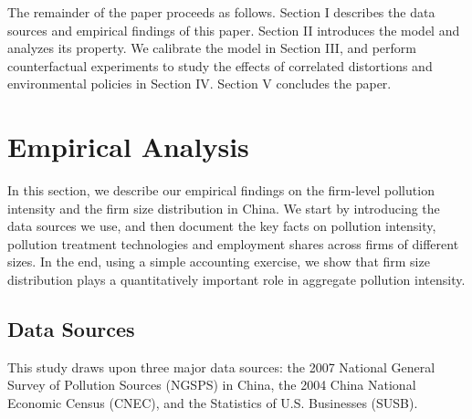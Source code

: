 \documentclass[AEJ]{AEA}
\begin{document}
The remainder of the paper proceeds as follows. Section I describes the data sources and empirical findings of this paper. Section II introduces the model and analyzes its property. We calibrate the model in Section III, and perform counterfactual experiments to study the effects of correlated distortions and environmental policies in Section IV. Section V concludes the paper.

\section{Empirical Analysis}

In this section, we describe our empirical findings on the firm-level pollution intensity and the firm size distribution in China. We start by introducing the data sources we use, and then document the key facts on pollution intensity, pollution treatment technologies and employment shares across firms of different sizes. In the end, using a simple accounting exercise, we show that firm size distribution plays a quantitatively important role in aggregate pollution intensity.

\subsection{Data Sources}
\label{sec:data_source}

This study draws upon three major data sources: the 2007 National General Survey of Pollution Sources (NGSPS) in China, the 2004 China National Economic Census (CNEC), and the Statistics of U.S. Businesses (SUSB).
\end{document}
